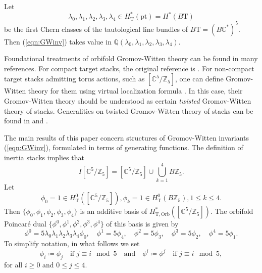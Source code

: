 \documentclass[12pt]{amsart}
\numberwithin{equation}{section}
\begin{document}
Let $$\lambda_0,\lambda_1, \lambda_2, \lambda_3,\lambda_{4}\in H^*_\mathrm{T}(\text{pt})=H^*(B\mathrm{T})$$ be the first Chern classes of the tautological line bundles of $B\mathrm{T}=(B\mathbb{C}^*)^5$. Then (\ref{eqn:GWinv}) takes value in $\mathbb{Q}(\lambda_0,\lambda_1, \lambda_2, \lambda_3,\lambda_{4})$.

Foundational treatments of orbifold Gromov-Witten theory can be found in many references. For compact target stacks, the original reference is \cite{agv}. For non-compact target stacks admitting torus actions, such as $[\mathbb{C}^5/\mathbb{Z}_5]$, one can define Gromov-Witten theory for them using virtual localization formula \cite{grpan}. In this case, their Gromov-Witten theory should be understood as certain {\em twisted} Gromov-Witten theory of stacks. Generalities on twisted Gromov-Witten theory of stacks can be found in \cite{ccit} and \cite{Tseng}.

The main results of this paper concern structures of Gromov-Witten invariants (\ref{eqn:GWinv}), formulated in terms of generating functions. The definition of inertia stacks implies that 
\begin{equation*}
    I[\mathbb{C}^5/\mathbb{Z}_5]=[\mathbb{C}^5/\mathbb{Z}_5]\cup\bigcup_{k=1}^{4} B\mathbb{Z}_5.
\end{equation*}
Let 
\begin{equation*}
\phi_0=1\in H^0_\mathrm{T}([\mathbb{C}^5/\mathbb{Z}_5]), \phi_k=1\in H^0_\mathrm{T}(B\mathbb{Z}_5), 1\leq k\leq 4.
\end{equation*}
Then $\{\phi_0,\phi_1, \phi_2, \phi_3,\phi_{4}\}$ is an additive basis of $H^*_\mathrm{T,Orb}([\mathbb{C}^5/\mathbb{Z}_5])$. The orbifold Poincar\'e dual $\{\phi^0,\phi^1, \phi^2, \phi^3,\phi^{4}\}$ of this basis is given by
\begin{equation*}
\phi^0=5\lambda_0\lambda_1\lambda_2\lambda_3\lambda_{4}\phi_0,\quad \phi^1=5\phi_{4},\quad \phi^2=5\phi_{3},\quad \phi^3=5\phi_{2}, \quad \phi^{4}=5\phi_1.
\end{equation*}
To simplify notation, in what follows we set \begin{equation*}
\phi_i\coloneqq\phi_j\quad\text{if }j\equiv{i}\mod{5}\quad\text{and}\quad\phi^i\coloneqq\phi^j\quad\text{if }j\equiv{i}\mod{5},
\end{equation*}
for all $i\geq{0}$ and $0\leq{j}\leq{4}$.   
\end{document}
